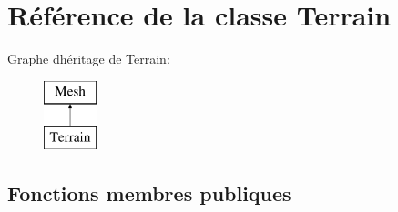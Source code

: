 \hypertarget{class_terrain}{}\section{Référence de la classe Terrain}
\label{class_terrain}
Graphe d\textquotesingle{}héritage de Terrain\+:\begin{figure}[H]
\begin{center}
\leavevmode
\includegraphics[height=2.000000cm]{class_terrain}
\end{center}
\end{figure}
\subsection*{Fonctions membres publiques}
